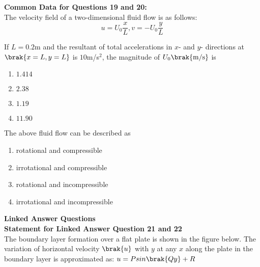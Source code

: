 \iffalse
\author{Manvik Muthyapu - AI24BTECH11021}
\section{xe}
\chapter{2010}
\fi

\item[] \textbf{Common Data for Questions 19 and 20:}\\

The velocity field of a two-dimensional fluid flow is as follows:
$$u=U_{0}\frac{x}{L}, v=-U_{0}\frac{y}{L}$$

\item  If $L=0.2$m and the resultant of total accelerations in $x$- and $y$- directions at $\brak{x=L ,y=L}$ is $10$m/s$^2$, the magnitude of $U_{0}\brak{\text{m/s}}$ is

\begin{enumerate}
	\item $ 1.414 $
	\item $2.38$
	\item $1.19$
	\item $11.90$
\end{enumerate}

\item The above fluid flow can be described as

\begin{enumerate}
	\item rotational and compressible
	\item irrotational and compressible
	\item rotational and incompressible
	\item irrotational and incompressible\\
\end{enumerate}

\textbf{Linked Answer Questions}\\

\textbf{Statement for Linked Answer Question 21 and 22}\\

The boundary layer formation over a flat plate is shown in the figure below. The variation of horizontal velocity $\brak{u}$ with $y$ at any $x$ along the plate in the boundary layer is approximated as: $u=Psin\brak{Qy}+R$\\

